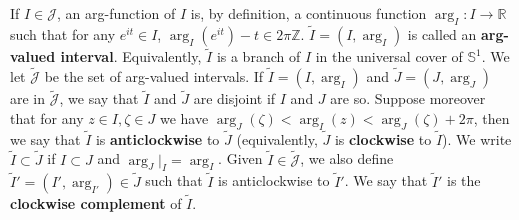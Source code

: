 \documentclass[12pt,a4paper]{article}
\theoremstyle{definition}
\theoremstyle{plain}
\newcommand{\mc}{\mathcal}
\newcommand{\wtd}{\widetilde}
\newcommand{\Jtd}{\widetilde{\mathcal J}}
\newcommand{\mbb}{\mathbb}
\numberwithin{equation}{section}
\begin{document}
If $I\in\mc J$, an arg-function of $I$ is, by definition, a continuous function $\arg_I:I\rightarrow\mbb R$ such that for any $e^{it}\in I$, $\arg_I(e^{it})-t\in 2\pi\mbb Z$. $\wtd I=(I,\arg_I)$ is called an \textbf{arg-valued interval}. Equivalently, $\wtd I$ is a branch of $I$ in the universal cover of $\mbb S^1$. We let $\wtd{\mc J}$ be the set of arg-valued intervals. If $\wtd I=(I,\arg_I)$ and $\wtd J=(J,\arg_J)$ are in $\Jtd$, we say that $\wtd I$ and $\wtd J$ are disjoint if $I$ and $J$ are so. Suppose moreover that for any $z\in I,\zeta\in J$ we have $\arg_J(\zeta)<\arg_I(z)<\arg_J(\zeta)+2\pi$, then we say that $\wtd I$ is \textbf{anticlockwise} to $\wtd J$ (equivalently, $\wtd J$ is \textbf{clockwise} to $\wtd I$). We write $\wtd I\subset\wtd J$ if $I\subset J$ and $\arg_J|_I=\arg_I$. Given $\wtd I\in\Jtd$, we also define $\wtd I'=(I',\arg_{I'})\in\wtd J$ such that $\wtd I$ is anticlockwise to $\wtd I'$. We say that $\wtd I'$ is the \textbf{clockwise complement} of $\wtd I$.
\end{document}

